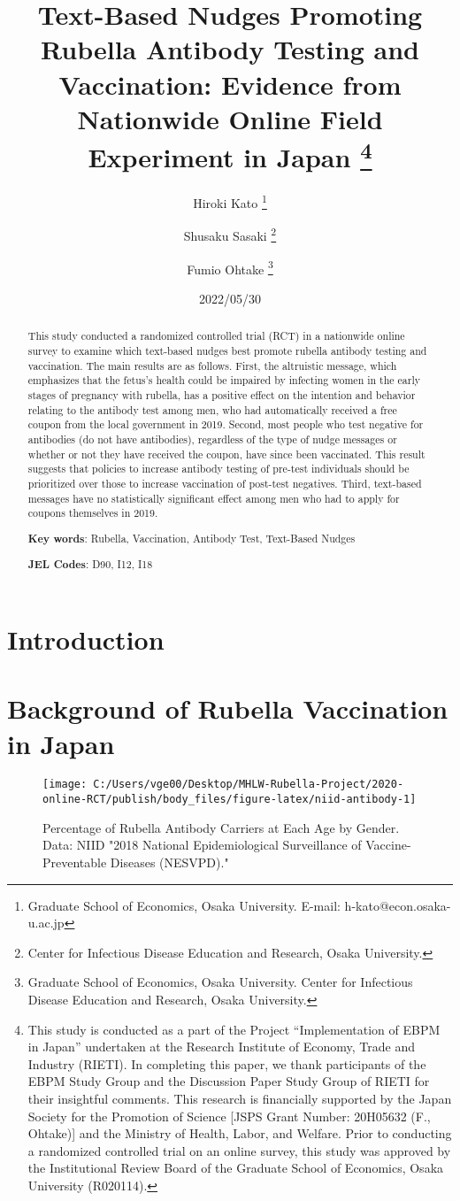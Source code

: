 \documentclass[
  11pt,
  a4paper,
]{article}
\title{Text-Based Nudges Promoting Rubella Antibody Testing and Vaccination:
Evidence from Nationwide Online Field Experiment in Japan  \thanks{This study is conducted as a part of the Project ``Implementation of EBPM in Japan''
undertaken at the Research Institute of Economy, Trade and Industry (RIETI).
In completing this paper,
we thank participants of the EBPM Study Group and
the Discussion Paper Study Group of RIETI for their insightful comments.
This research is financially supported by
the Japan Society for the Promotion of Science
{[}JSPS Grant Number: 20H05632 (F., Ohtake){]}
and the Ministry of Health, Labor, and Welfare.
Prior to conducting a randomized controlled trial on an online survey,
this study was approved by the Institutional Review Board
of the Graduate School of Economics, Osaka University (R020114).}  }
\author{
    Hiroki Kato
  \thanks{Graduate School of Economics, Osaka University. E-mail: h-kato@econ.osaka-u.ac.jp  }
  \and
    Shusaku Sasaki
  \thanks{Center for Infectious Disease Education and Research, Osaka University.  }
  \and
    Fumio Ohtake
  \thanks{Graduate School of Economics, Osaka University.
Center for Infectious Disease Education and Research, Osaka University.  }
  \and
  }
\date{2022/05/30}
\begin{document}
\begin{spacing}{1}
  \maketitle
\end{spacing}
\begin{spacing}{1}
  \begin{abstract}
    This study conducted a randomized controlled trial (RCT) in a nationwide online survey
    to examine which text-based nudges best promote rubella antibody testing and vaccination.
    The main results are as follows.
    First, the altruistic message,
    which emphasizes that the fetus's health could be impaired by
    infecting women in the early stages of pregnancy with rubella,
    has a positive effect on the intention and behavior relating to the antibody test among men,
    who had automatically received a free coupon from the local government in 2019.
    Second, most people who test negative for antibodies (do not have antibodies),
    regardless of the type of nudge messages or whether or not they have received the coupon,
    have since been vaccinated.
    This result suggests that policies to increase antibody testing of pre-test individuals
    should be prioritized over those to increase vaccination of post-test negatives.
    Third, text-based messages have no statistically significant effect
    among men who had to apply for coupons themselves in 2019.
    
                \noindent
    \textbf{Key words}: Rubella, Vaccination, Antibody Test, Text-Based Nudges
        
        \noindent
    \textbf{JEL Codes}: D90, I12, I18
            
  \end{abstract}
\end{spacing}

\hypertarget{intro}{%
\section{Introduction}\label{intro}}

\hypertarget{background}{%
\section{Background of Rubella Vaccination in Japan}\label{background}}

\begin{figure}[t]
\texttt{[image: C:/Users/vge00/Desktop/MHLW-Rubella-Project/2020-online-RCT/publish/body\_files/figure-latex/niid-antibody-1]} \caption{Percentage of Rubella Antibody Carriers at Each Age by Gender. Data: NIID "2018 National Epidemiological Surveillance of Vaccine-Preventable Diseases (NESVPD)."}\label{fig:niid-antibody}
\end{figure}
\end{document}
